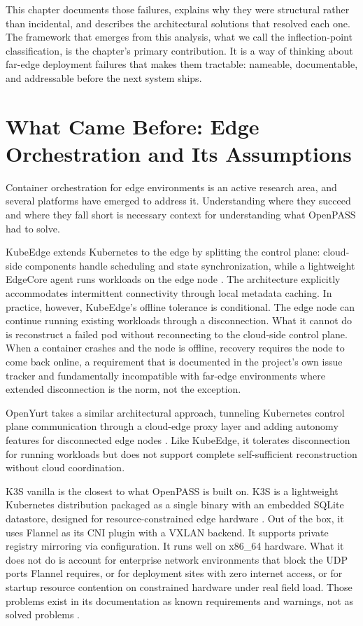 This chapter documents those failures, explains why they were structural rather than incidental, and describes the architectural solutions that resolved each one. The framework that emerges from this analysis, what we call the inflection-point classification, is the chapter's primary contribution. It is a way of thinking about far-edge deployment failures that makes them tractable: nameable, documentable, and addressable before the next system ships.

\section{What Came Before: Edge Orchestration and Its Assumptions}
\label{sec:ch3_arch}
Container orchestration for edge environments is an active research area, and several platforms have emerged to address it. Understanding where they succeed and where they fall short is necessary context for understanding what OpenPASS had to solve.

KubeEdge extends Kubernetes to the edge by splitting the control plane: cloud-side components handle scheduling and state synchronization, while a lightweight EdgeCore agent runs workloads on the edge node \cite{xiong2018kubeedge}. The architecture explicitly accommodates intermittent connectivity through local metadata caching. In practice, however, KubeEdge's offline tolerance is conditional. The edge node can continue running existing workloads through a disconnection. What it cannot do is reconstruct a failed pod without reconnecting to the cloud-side control plane. When a container crashes and the node is offline, recovery requires the node to come back online, a requirement that is documented in the project's own issue tracker and fundamentally incompatible with far-edge environments where extended disconnection is the norm, not the exception.

OpenYurt takes a similar architectural approach, tunneling Kubernetes control plane communication through a cloud-edge proxy layer and adding autonomy features for disconnected edge nodes \cite{yakubov2025comparative}. Like KubeEdge, it tolerates disconnection for running workloads but does not support complete self-sufficient reconstruction without cloud coordination.

K3S vanilla is the closest to what OpenPASS is built on. K3S is a lightweight Kubernetes distribution packaged as a single binary with an embedded SQLite datastore, designed for resource-constrained edge hardware \cite{k3sdocs2024}. Out of the box, it uses Flannel as its CNI plugin with a VXLAN backend. It supports private registry mirroring via configuration. It runs well on x86\_64 hardware. What it does not do is account for enterprise network environments that block the UDP ports Flannel requires, or for deployment sites with zero internet access, or for startup resource contention on constrained hardware under real field load. Those problems exist in its documentation as known requirements and warnings, not as solved problems \cite{k3sdocs2024}.

